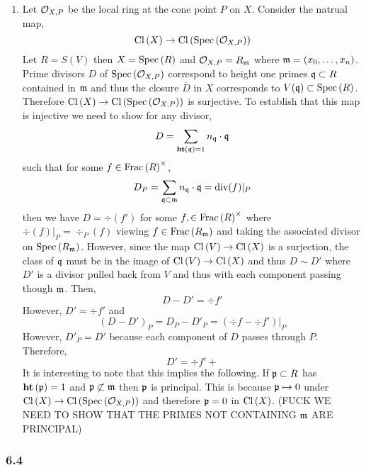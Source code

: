\documentclass[12pt]{article}
\begin{document}
\begin{enumerate}
\item Let $\mathcal{O}_{X, P}$ be the local ring at the cone point $P$ on $X$. Consider the natrual map,
\[ \mathrm{Cl} \left( X \right) \to \mathrm{Cl} \left( \mathrm{Spec}\left( \mathcal{O}_{X, P} \right) \right) \]
Let $R = S(V)$ then $X = \mathrm{Spec}\left( R \right)$ and $\mathcal{O}_{X, P} = R_{\mathfrak{m}}$ where $\mathfrak{m} = (x_0, \dots, x_n)$. Prime divisors $D$ of $\mathrm{Spec}\left( \mathcal{O}_{X, P} \right)$ correspond to height one primes $\mathfrak{q} \subset R$ contained in $\mathfrak{m}$ and thus the closure $\overline{D}$ in $X$ corresponds to $V(\mathfrak{q}) \subset \mathrm{Spec}\left( R \right)$. Therefore $\mathrm{Cl} \left( X \right) \to \mathrm{Cl} \left( \mathrm{Spec}\left( \mathcal{O}_{X, P} \right) \right)$ is surjective. To establish that this map is injective we need to show for any divisor,
\[ D = \sum_{\mathbf{ht}\left( \mathfrak{q} \right) = 1} n_{\mathfrak{q}} \cdot \mathfrak{q} \]
such that for some $f \in \mathrm{Frac}\left(R\right)^\times$,
\[ D_P = \sum_{\mathfrak{q} \subset \mathfrak{m}} n_{\mathfrak{q}} \cdot \mathfrak{q} = \mathrm{div}{(f)}|_P \]
then we have $D = \div{(f')}$ for some $f, \in \mathrm{Frac}\left(R\right)^\times$ where $\div{(f)}|_P = \div_P{(f)}$ viewing $f \in \mathrm{Frac}\left(R_{\mathfrak{m}}\right)$ and taking the associated divisor on $\mathrm{Spec}\left( R_{\mathfrak{m}} \right)$. However, since the map $\mathrm{Cl} \left( V \right) \to \mathrm{Cl} \left( X \right)$ is a surjection, the class of $\mathfrak{q}$ must be in the image of $\mathrm{Cl} \left( V \right) \to \mathrm{Cl} \left( X \right)$ and thus $D \sim D'$ where $D'$ is a divisor pulled back from $V$ and thus with each component passing though $\mathfrak{m}$. Then,
\[ D - D' = \div{f'} \]
However, $D' = \div{f'}$ and 
\[ (D - D')_P = D_P - D'_P = (\div{f} - \div{f'})|_P \]
However, $D'_P = D'$ because each component of $D$ passes through $P$. Therefore,
\[ D' = \div{f'} +  \]
It is interesting to note that this implies the following. If $\mathfrak{p} \subset R$ has $\mathbf{ht}\left( \mathfrak{p} \right) = 1$ and $\mathfrak{p} \not\subset \mathfrak{m}$ then $\mathfrak{p}$ is principal. This is because $\mathfrak{p} \mapsto 0$ under $\mathrm{Cl} \left( X \right) \to \mathrm{Cl} \left( \mathrm{Spec}\left( \mathcal{O}_{X, P} \right) \right)$ and therefore $\mathfrak{p} = 0$ in $\mathrm{Cl} \left( X \right)$.  
(FUCK WE NEED TO SHOW THAT THE PRIMES NOT CONTAINING $\mathfrak{m}$ ARE PRINCIPAL)
\end{enumerate}

\subsubsection{6.4}
\end{document}
